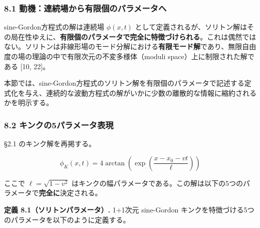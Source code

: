 \documentclass[a4paper,11pt]{ltjsarticle}
\begin{document}
\subsubsection{8.1
動機：連続場から有限個のパラメータへ}\label{ux52d5ux6a5fux9023ux7d9aux5834ux304bux3089ux6709ux9650ux500bux306eux30d1ux30e9ux30e1ux30fcux30bfux3078}

sine-Gordon方程式の解は連続場 \(\phi(x, t)\)
として定義されるが、ソリトン解はその局在性ゆえに、\textbf{有限個のパラメータで完全に特徴づけられる}。これは偶然ではない。ソリトンは非線形場のモード分解における\textbf{有限モード解}であり、無限自由度の場の理論の中で有限次元の不変多様体（moduli
space）上に制限された解である {[}10, 22{]}。

本節では、sine-Gordon方程式のソリトン解を有限個のパラメータで記述する定式化を与え、連続的な波動方程式の解がいかに少数の離散的な情報に縮約されるかを明示する。

\subsubsection{8.2
キンクの5パラメータ表現}\label{ux30adux30f3ux30afux306e5ux30d1ux30e9ux30e1ux30fcux30bfux8868ux73fe}

§2.1 のキンク解を再掲する。

\[\phi_K(x, t) = 4\arctan\left(\exp\left(\frac{x - x_0 - vt}{\ell}\right)\right)\]

ここで \(\ell = \sqrt{1 - v^2}\)
はキンクの幅パラメータである。この解は以下の5つのパラメータで\textbf{完全に}決定される。

\textbf{定義 8.1（ソリトンパラメータ）.} 1+1次元 sine-Gordon
キンクを特徴づける5つのパラメータを以下のように定義する。
\end{document}
